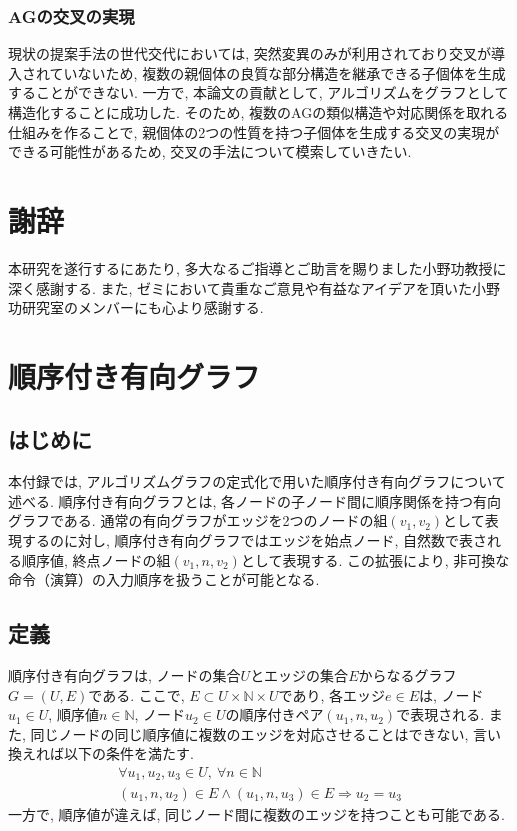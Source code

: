 \documentclass[11pt,oneside,openany,report]{jsbook}
\begin{document}
\subsection{AGの交叉の実現}

現状の提案手法の世代交代においては, 突然変異のみが利用されており交叉が導入されていないため, 複数の親個体の良質な部分構造を継承できる子個体を生成することができない. 一方で, 本論文の貢献として, アルゴリズムをグラフとして構造化することに成功した. そのため, 複数のAGの類似構造や対応関係を取れる仕組みを作ることで, 親個体の2つの性質を持つ子個体を生成する交叉の実現ができる可能性があるため, 交叉の手法について模索していきたい.




\chapter*{謝辞}

本研究を遂行するにあたり, 多大なるご指導とご助言を賜りました小野功教授に深く感謝する. また, ゼミにおいて貴重なご意見や有益なアイデアを頂いた小野功研究室のメンバーにも心より感謝する.

\appendix

\chapter{順序付き有向グラフ} \label{chap:ordered_directed_graph}

\section{はじめに}
本付録では, アルゴリズムグラフの定式化で用いた順序付き有向グラフについて述べる. 順序付き有向グラフとは, 各ノードの子ノード間に順序関係を持つ有向グラフである. 通常の有向グラフがエッジを2つのノードの組$(v_1, v_2)$として表現するのに対し, 順序付き有向グラフではエッジを始点ノード, 自然数で表される順序値, 終点ノードの組$(v_1, n, v_2)$として表現する. この拡張により, 非可換な命令（演算）の入力順序を扱うことが可能となる.

\section{定義}
順序付き有向グラフは, ノードの集合$U$とエッジの集合$E$からなるグラフ$G = (U, E)$である. ここで, $E \subset U \times \mathbb{N} \times U$であり, 各エッジ$e \in E$は, ノード$u_1 \in U$, 順序値$n \in \mathbb{N}$, ノード$u_2 \in U$の順序付きペア$(u_1, n, u_2)$で表現される. また, 同じノードの同じ順序値に複数のエッジを対応させることはできない, 言い換えれば以下の条件を満たす.
\begin{gather*}
\forall u_1, u_2, u_3 \in U,\ \forall n \in \mathbb{N} \\
(u_1, n, u_2) \in E \land (u_1, n, u_3) \in E \Rightarrow u_2 = u_3
\end{gather*}
\noindent
一方で, 順序値が違えば, 同じノード間に複数のエッジを持つことも可能である.
\end{document}
